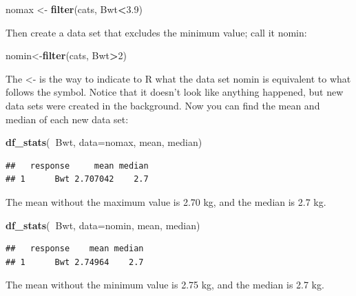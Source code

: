 \documentclass[
]{book}
\newenvironment{Shaded}{\begin{snugshade}}{\end{snugshade}}
\newcommand{\DataTypeTok}[1]{\textcolor[rgb]{0.13,0.29,0.53}{#1}}
\newcommand{\DecValTok}[1]{\textcolor[rgb]{0.00,0.00,0.81}{#1}}
\newcommand{\FloatTok}[1]{\textcolor[rgb]{0.00,0.00,0.81}{#1}}
\newcommand{\KeywordTok}[1]{\textcolor[rgb]{0.13,0.29,0.53}{\textbf{#1}}}
\newcommand{\NormalTok}[1]{#1}
\newcommand{\OperatorTok}[1]{\textcolor[rgb]{0.81,0.36,0.00}{\textbf{#1}}}
\newcommand{\StringTok}[1]{\textcolor[rgb]{0.31,0.60,0.02}{#1}}
\begin{document}
\begin{Shaded}
\begin{Highlighting}[]
\NormalTok{nomax <-}\StringTok{ }\KeywordTok{filter}\NormalTok{(cats, Bwt}\OperatorTok{<}\FloatTok{3.9}\NormalTok{)}
\end{Highlighting}
\end{Shaded}

Then create a data set that excludes the minimum value; call it nomin:

\begin{Shaded}
\begin{Highlighting}[]
\NormalTok{nomin<-}\KeywordTok{filter}\NormalTok{(cats, Bwt}\OperatorTok{>}\DecValTok{2}\NormalTok{)}
\end{Highlighting}
\end{Shaded}

The \textless- is the way to indicate to R what the data set nomin is equivalent to what follows the symbol. Notice that it doesn't look like anything happened, but new data sets were created in the background. Now you can find the mean and median of each new data set:

\begin{Shaded}
\begin{Highlighting}[]
\KeywordTok{df_stats}\NormalTok{(}\OperatorTok{~}\NormalTok{Bwt, }\DataTypeTok{data=}\NormalTok{nomax, mean, median)}
\end{Highlighting}
\end{Shaded}

\begin{verbatim}
##   response     mean median
## 1      Bwt 2.707042    2.7
\end{verbatim}

The mean without the maximum value is 2.70 kg, and the median is 2.7 kg.

\begin{Shaded}
\begin{Highlighting}[]
\KeywordTok{df_stats}\NormalTok{(}\OperatorTok{~}\NormalTok{Bwt, }\DataTypeTok{data=}\NormalTok{nomin, mean, median)}
\end{Highlighting}
\end{Shaded}

\begin{verbatim}
##   response    mean median
## 1      Bwt 2.74964    2.7
\end{verbatim}

The mean without the minimum value is 2.75 kg, and the median is 2.7 kg.
\end{document}
